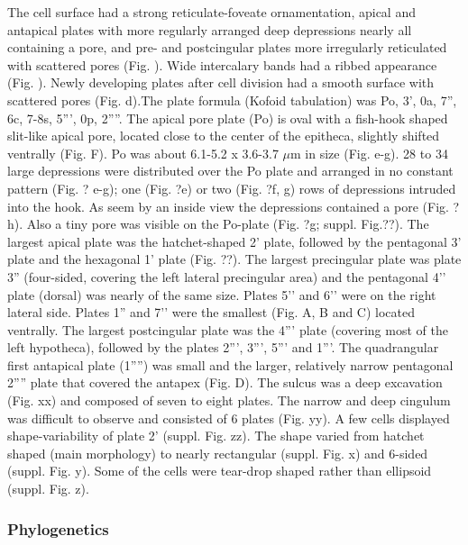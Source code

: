 \documentclass[12pt]{article}
\begin{document}
The cell surface had a strong  reticulate-foveate ornamentation, apical and antapical plates with more regularly arranged deep depressions nearly all containing a pore, and pre- and postcingular plates more irregularly reticulated with scattered pores (Fig. ). Wide intercalary bands had a ribbed appearance (Fig. ). Newly developing plates after cell division had a smooth surface with scattered pores (Fig. d).The plate formula (Kofoid tabulation) was Po, 3’, 0a, 7”, 6c, 7-8s, 5”’, 0p, 2””. The apical pore plate (Po) is oval with a fish-hook shaped slit-like apical pore, located close to the center of the epitheca, slightly shifted ventrally (Fig.  F). Po was about 6.1-5.2 x 3.6-3.7 $\mu$m in size (Fig. e-g). 28 to 34 large depressions were distributed over the Po plate and arranged in no constant pattern (Fig. ? e-g); one (Fig. ?e) or two (Fig. ?f, g) rows of depressions intruded into the hook. As seem by an inside view the depressions contained a pore (Fig. ?h). Also a tiny pore was visible on the Po-plate (Fig. ?g; suppl. Fig.??). The largest apical plate was the hatchet-shaped 2’ plate, followed by the pentagonal 3’ plate and the hexagonal 1’ plate (Fig. ??). The largest precingular plate was plate 3” (four-sided, covering the left lateral precingular area) and the pentagonal 4’’ plate (dorsal) was nearly of the same size. Plates 5’’ and 6’’ were on the right lateral side. Plates 1” and 7’’ were the smallest (Fig.  A, B and C) located ventrally. The largest postcingular plate was the 4”’ plate (covering most of the left hypotheca), followed by the plates 2”’, 3”’, 5”’ and 1”’. The quadrangular first antapical plate (1””) was small and the larger, relatively narrow pentagonal 2”” plate that covered the antapex (Fig. D). The sulcus was a deep excavation (Fig. xx) and composed of seven to eight plates. The narrow and deep cingulum was difficult to observe and consisted of 6 plates (Fig. yy).
A few cells displayed shape-variability of plate 2’ (suppl. Fig. zz). The shape varied from hatchet shaped (main morphology) to nearly rectangular (suppl. Fig. x) and 6-sided (suppl. Fig. y). Some of the cells were tear-drop shaped rather than ellipsoid (suppl. Fig. z). 

\subsubsection{Phylogenetics}
\end{document}
